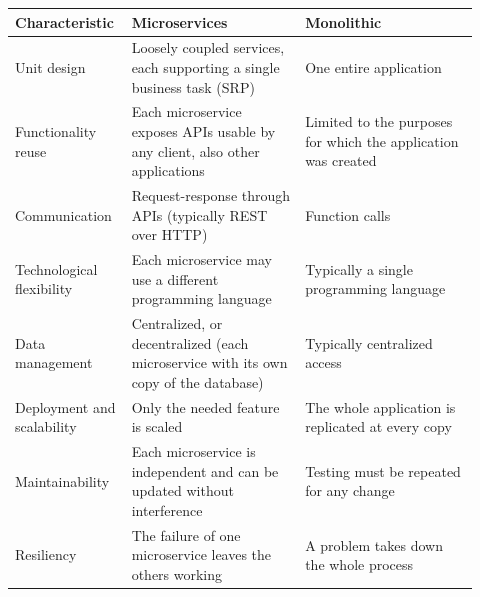 \begin{center}
\small
\begin{tabular}{@{}>{\raggedright\arraybackslash}p{0.2\linewidth}>{\raggedright\arraybackslash}p{0.36\linewidth}>{\raggedright\arraybackslash}p{0.36\linewidth}@{}}
\toprule
\textbf{Characteristic} & \textbf{Microservices} & \textbf{Monolithic}\\
\midrule
Unit design & Loosely coupled services, each supporting a single business task (SRP) & One entire application\\
Functionality reuse & Each microservice exposes APIs usable by any client, also other applications & Limited to the purposes for which the application was created\\
Communication & Request-response through APIs (typically REST over HTTP) & Function calls\\
Technological flexibility & Each microservice may use a different programming language & Typically a single programming language\\
Data management & Centralized, or decentralized (each microservice with its own copy of the database) & Typically centralized access\\
Deployment and scalability & Only the needed feature is scaled & The whole application is replicated at every copy\\
Maintainability & Each microservice is independent and can be updated without interference & Testing must be repeated for any change\\
Resiliency & The failure of one microservice leaves the others working & A problem takes down the whole process\\
\bottomrule
\end{tabular}
\end{center}

